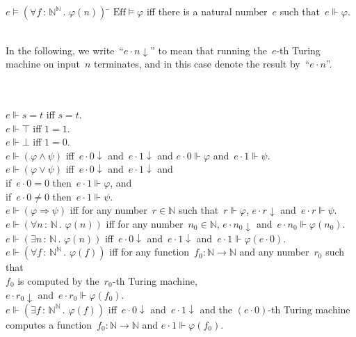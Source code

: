 \documentclass[oneside,reqno]{amsart}
\theoremstyle{definition}
\theoremstyle{plain}
\theoremstyle{remark}
\newcommand{\NN}{\mathbb{N}}
\newcommand{\Eff}{\mathrm{Ef{}f}}
\renewcommand{\_}{\mathpunct{.}\,}
\newcommand{\effective}{ef{}fective\xspace}
\newcommand{\?}{\,{:}\,}
\newcommand{\realizes}{\Vdash}
\begin{document}
\begin{table}
  \begin{tabbing}
    $e \models (\forall f\?\NN^\NN\_ \varphi(n))$ \= \kill
    $\Eff \models \varphi$ \> iff there is a natural number~$e$ such that~$e
    \realizes \varphi$. \\\\
    \begin{minipage}{\textwidth}
    In the following, we write~``$e \cdot n \downarrow$'' to mean that running
    the~$e$-th Turing machine on input~$n$ terminates, and in this case denote
    the result by~``$e \cdot n$''.\end{minipage} \\\\
    $e \realizes s = t$ \> iff $s = t$. \\
    $e \realizes \top$ \> iff $1 = 1$. \\
    $e \realizes \bot$ \> iff $1 = 0$. \\
    $e \realizes (\varphi \wedge \psi)$ \> iff~$e \cdot 0 \downarrow$ and~$e
    \cdot 1 \downarrow$ and $e\cdot0 \realizes \varphi$ and~$e\cdot1 \realizes \psi$. \\
    $e \realizes (\varphi \vee \psi)$ \> iff~$e \cdot 0 \downarrow$ and~$e
    \cdot 1 \downarrow$ and \\ \> \qquad if~$e\cdot0 = 0$ then~$e\cdot1 \realizes
    \varphi$, and \\ \> \qquad if~$e\cdot0 \neq 0$ then~$e\cdot1 \realizes \psi$. \\
    $e \realizes (\varphi \Rightarrow \psi)$ \> iff for any number~$r \in \NN$
    such that~$r \realizes \varphi$, $e \cdot r \downarrow$ and~$e \cdot r \realizes \psi$. \\
    $e \realizes (\forall n\?\NN\_ \varphi(n))$ \> iff for any number~$n_0
    \in \NN$, $e \cdot n_0 \downarrow$ and~$e \cdot n_0 \realizes \varphi(n_0)$. \\
    $e \realizes (\exists n\?\NN\_ \varphi(n))$ \> iff~$e\cdot0 \downarrow$ and~$e\cdot1 \downarrow$
    and~$e\cdot1 \realizes \varphi(e\cdot0)$. \\
    $e \realizes (\forall f\?\NN^\NN\_ \varphi(f))$ \> iff for any function~$f_0
    : \NN \to \NN$ and any number~$r_0$ such that \\ \> \qquad $f_0$ is computed by the~$r_0$-th
    Turing machine, \\ \> \qquad
    $e \cdot r_0 \downarrow$ and~$e \cdot r_0 \realizes \varphi(f_0)$. \\
    $e \realizes (\exists f\?\NN^\NN\_ \varphi(f))$ \> iff~$e \cdot 0 \downarrow$
    and~$e \cdot 1 \downarrow$ and
    the $(e \cdot 0)$-th Turing machine \\ \> \qquad computes a function~$f_0 : \NN \to \NN$
    and $e \cdot 1 \realizes \varphi(f_0)$.
  \end{tabbing}

  \caption{\label{table:eff} A (fragment of) the translation
  rules defining the meaning of statements internal to the \effective topos.}
\end{table}
\end{document}
